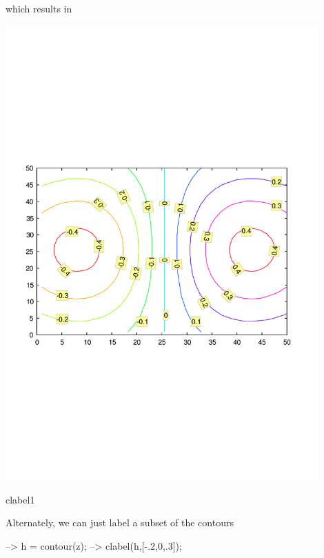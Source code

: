 which results in  
\begin{DoxyImage}
\includegraphics[width=12cm]{clabel1}
\caption{clabel1}
\end{DoxyImage}
 Alternately, we can just label a subset of the contours


\begin{DoxyVerbInclude}
--> h = contour(z);
--> clabel(h,[-.2,0,.3]);
\end{DoxyVerbInclude}


